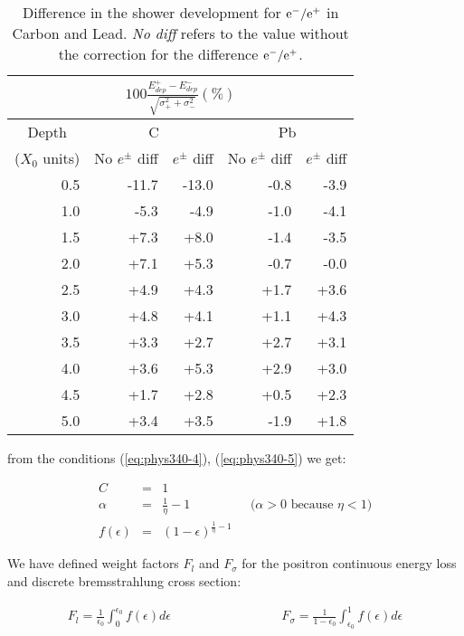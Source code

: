 \begin{table}[hbt]
\begin{centering}
\begin{tabular}{r|rr|rr}
\multicolumn{5}{c}{$\displaystyle{100 \frac{E^{+}_{dep}-E^{-}_{dep}}
{\sqrt{\sigma_{+}^{2}+\sigma_{-}^{2}}} (\%)}$} \\[5mm]
\hline
\multicolumn{1}{c}{Depth}
& \multicolumn{2}{c}{C}
& \multicolumn{2}{|c}{Pb} \\
\multicolumn{1}{c|}{($X_{0}$ units)} &
No $e^{\pm}$ diff & $e^{\pm}$ diff &
No $e^{\pm}$ diff & $e^{\pm}$ diff \\
\hline
0.5 &   -11.7 & -13.0 &  -0.8 &  -3.9 \\
1.0 &    -5.3 &  -4.9 &  -1.0 &  -4.1 \\
1.5 &    +7.3 &  +8.0 &  -1.4 &  -3.5 \\
2.0 &    +7.1 &  +5.3 &  -0.7 &  -0.0 \\
2.5 &    +4.9 &  +4.3 &  +1.7 &  +3.6 \\
3.0 &    +4.8 &  +4.1 &  +1.1 &  +4.3 \\
3.5 &    +3.3 &  +2.7 &  +2.7 &  +3.1 \\
4.0 &    +3.6 &  +5.3 &  +2.9 &  +3.0 \\
4.5 &    +1.7 &  +2.8 &  +0.5 &  +2.3 \\
5.0 &    +3.4 &  +3.5 &  -1.9 &  +1.8 \\
\hline
\end{tabular}
\caption{Difference in the shower development 
for $\mathrm{e}^-/\mathrm{e}^+$ in Carbon and Lead.
{\it No diff} refers to the
value without the correction for the difference
$\mathrm{e}^-/\mathrm{e}^+$.}
\label{tb:phys340-4}
\end{centering}
\end{table}

from the conditions (\ref{eq:phys340-4}), (\ref{eq:phys340-5}) we get:

\begin{eqnarray*}
C & = & 1 \\
\alpha & = & \frac{1}{\eta} - 1 \hspace{2cm}
\mbox{($\alpha > 0$ because $\eta < 1$)} \\
f(\epsilon) & = & (1-\epsilon)^{\frac{1}{\eta}-1}
\end{eqnarray*}

We have defined weight factors $F_{l}$ and $F_{\sigma}$ for the
positron continuous energy loss and discrete bremsstrahlung cross
section:

\begin{eqnarray}
F_{l} = \frac{1}{\epsilon_{0}} \int^{\epsilon_{0}}_{0}
{f(\epsilon)d\epsilon} & \hspace{3cm} &
F_{\sigma} = \frac{1}{1-\epsilon_{0}} \int^{1}_{\epsilon_{0}}
{f(\epsilon)d\epsilon}
\label{eq:phys340-7}
\end{eqnarray}

